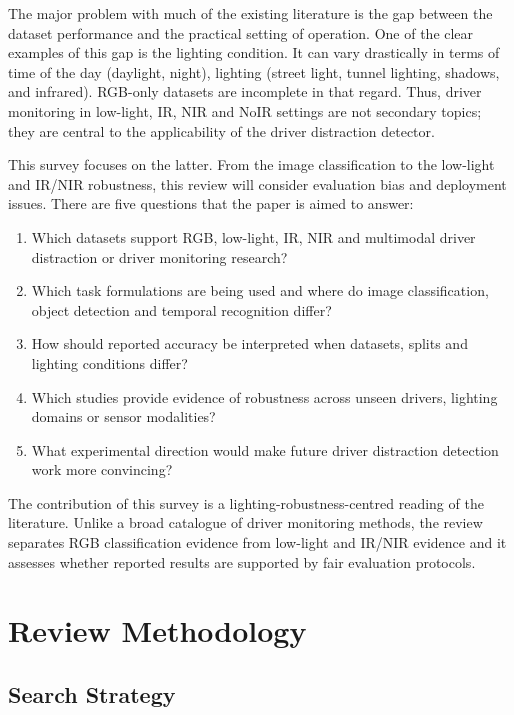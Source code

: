 \documentclass[11pt,a4paper]{article}
\let\oldsection\section
\renewcommand{\section}{\FloatBarrier\Needspace{9\baselineskip}\oldsection}
\let\oldsubsection\subsection
\renewcommand{\subsection}{\Needspace{6\baselineskip}\oldsubsection}
\begin{document}
The major problem with much of the existing literature is the gap between the dataset performance and the practical setting of operation. One of the clear examples of this gap is the lighting condition. It can vary drastically in terms of time of the day (daylight, night), lighting (street light, tunnel lighting, shadows, and infrared). RGB-only datasets are incomplete in that regard. Thus, driver monitoring in low-light, IR, NIR and NoIR settings are not secondary topics; they are central to the applicability of the driver distraction detector.

This survey focuses on the latter. From the image classification to the low-light and IR/NIR robustness, this review will consider evaluation bias and deployment issues. There are five questions that the paper is aimed to answer:

\begin{enumerate}
    \item Which datasets support RGB, low-light, IR, NIR and multimodal driver distraction or driver monitoring research?
    \item Which task formulations are being used and where do image classification, object detection and temporal recognition differ?
    \item How should reported accuracy be interpreted when datasets, splits and lighting conditions differ?
    \item Which studies provide evidence of robustness across unseen drivers, lighting domains or sensor modalities?
    \item What experimental direction would make future driver distraction detection work more convincing?
\end{enumerate}

The contribution of this survey is a lighting-robustness-centred reading of the literature. Unlike a broad catalogue of driver monitoring methods, the review separates RGB classification evidence from low-light and IR/NIR evidence and it assesses whether reported results are supported by fair evaluation protocols.

\clearpage
\section{Review Methodology}

\subsection{Search Strategy}
\end{document}
